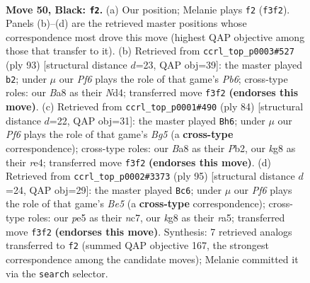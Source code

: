 \documentclass[11pt]{article}
\begin{document}
\clearpage

\begin{figure}[p]\centering
\begin{subfigure}{0.46\textwidth}\centering
\resizebox{\linewidth}{!}{%
\newchessgame
\chessboard[
  setfen={b5K1/P2k1pNP/8/4P3/8/R4p2/6r1/8 b - - 4 50},
  showmover=false,
  pgfstyle=straightmove, color=movearrow, markmove={f3-f2}
]}
\caption{}
\end{subfigure}\hfill
\begin{subfigure}{0.46\textwidth}\centering
\resizebox{\linewidth}{!}{%
\newchessgame
\chessboard[
  setfen={8/PR6/6kp/8/3n2P1/1p6/r4NKP/8 b - - 0 47},
  showmover=false,
  pgfstyle=straightmove, color=movearrow, markmove={b3-b2}
]}
\caption{}
\end{subfigure}
\\[4pt]
\begin{subfigure}{0.46\textwidth}\centering
\resizebox{\linewidth}{!}{%
\newchessgame
\chessboard[
  setfen={8/3k4/2p5/3n2B1/1p2r1P1/6K1/1P1R4/8 w - - 0 43},
  showmover=false,
  pgfstyle=straightmove, color=movearrow, markmove={g5-h6}
]}
\caption{}
\end{subfigure}\hfill
\begin{subfigure}{0.46\textwidth}\centering
\resizebox{\linewidth}{!}{%
\newchessgame
\chessboard[
  setfen={8/2N1k3/8/R3p3/P3b1p1/1KPr2P1/8/8 b - - 2 48},
  showmover=false,
  pgfstyle=straightmove, color=movearrow, markmove={e4-c6}
]}
\caption{}
\end{subfigure}
\caption{\textbf{Move 50, Black: \texttt{f2}.} (a) Our position; Melanie plays \texttt{f2} (\texttt{f3f2}). Panels (b)--(d) are the retrieved master positions whose correspondence most drove this move (highest QAP objective among those that transfer to it). (b) Retrieved from \texttt{ccrl\_top\_p0003\#527} (ply 93) [structural distance $d$=23, QAP obj=39]: the master played \texttt{b2}; under $\mu$ our \emph{Pf6} plays the role of that game's \emph{Pb6}; cross-type roles: our \emph{B}a8 as their \emph{N}d4; transferred move \texttt{f3f2} \textbf{(endorses this move)}. (c) Retrieved from \texttt{ccrl\_top\_p0001\#490} (ply 84) [structural distance $d$=22, QAP obj=31]: the master played \texttt{Bh6}; under $\mu$ our \emph{Pf6} plays the role of that game's \emph{Bg5} (a \textbf{cross-type} correspondence); cross-type roles: our \emph{B}a8 as their \emph{P}b2, our \emph{k}g8 as their \emph{r}e4; transferred move \texttt{f3f2} \textbf{(endorses this move)}. (d) Retrieved from \texttt{ccrl\_top\_p0002\#3373} (ply 95) [structural distance $d$=24, QAP obj=29]: the master played \texttt{Bc6}; under $\mu$ our \emph{Pf6} plays the role of that game's \emph{Be5} (a \textbf{cross-type} correspondence); cross-type roles: our \emph{p}e5 as their \emph{n}c7, our \emph{k}g8 as their \emph{r}a5; transferred move \texttt{f3f2} \textbf{(endorses this move)}. Synthesis: 7 retrieved analogs transferred to \texttt{f2} (summed QAP objective 167, the strongest correspondence among the candidate moves); Melanie committed it via the \texttt{search} selector.}
\label{fig:thought-m99}
\end{figure}
\end{document}
